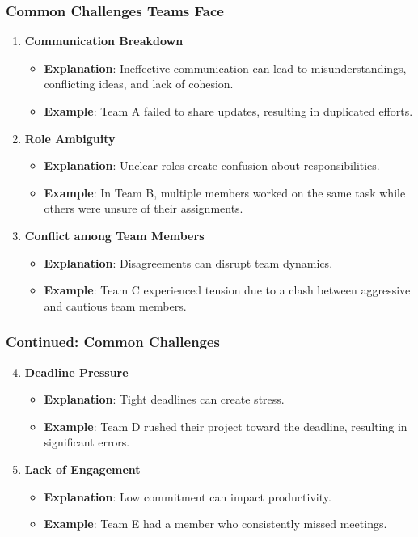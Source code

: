 \documentclass[aspectratio=169]{beamer}
\begin{document}
\begin{frame}[fragile]
    \frametitle{Common Challenges Teams Face}
    \begin{enumerate}
        \item \textbf{Communication Breakdown}
            \begin{itemize}
                \item \textbf{Explanation}: Ineffective communication can lead to misunderstandings, conflicting ideas, and lack of cohesion.
                \item \textbf{Example}: Team A failed to share updates, resulting in duplicated efforts.
            \end{itemize}
        
        \item \textbf{Role Ambiguity}
            \begin{itemize}
                \item \textbf{Explanation}: Unclear roles create confusion about responsibilities.
                \item \textbf{Example}: In Team B, multiple members worked on the same task while others were unsure of their assignments.
            \end{itemize}
        
        \item \textbf{Conflict among Team Members}
            \begin{itemize}
                \item \textbf{Explanation}: Disagreements can disrupt team dynamics.
                \item \textbf{Example}: Team C experienced tension due to a clash between aggressive and cautious team members.
            \end{itemize}
    \end{enumerate}
\end{frame}

\begin{frame}[fragile]
    \frametitle{Continued: Common Challenges}
    \begin{enumerate}
        \setcounter{enumi}{3}
        \item \textbf{Deadline Pressure}
            \begin{itemize}
                \item \textbf{Explanation}: Tight deadlines can create stress.
                \item \textbf{Example}: Team D rushed their project toward the deadline, resulting in significant errors.
            \end{itemize}
        
        \item \textbf{Lack of Engagement}
            \begin{itemize}
                \item \textbf{Explanation}: Low commitment can impact productivity.
                \item \textbf{Example}: Team E had a member who consistently missed meetings.
            \end{itemize}
    \end{enumerate}
\end{frame}
\end{document}
